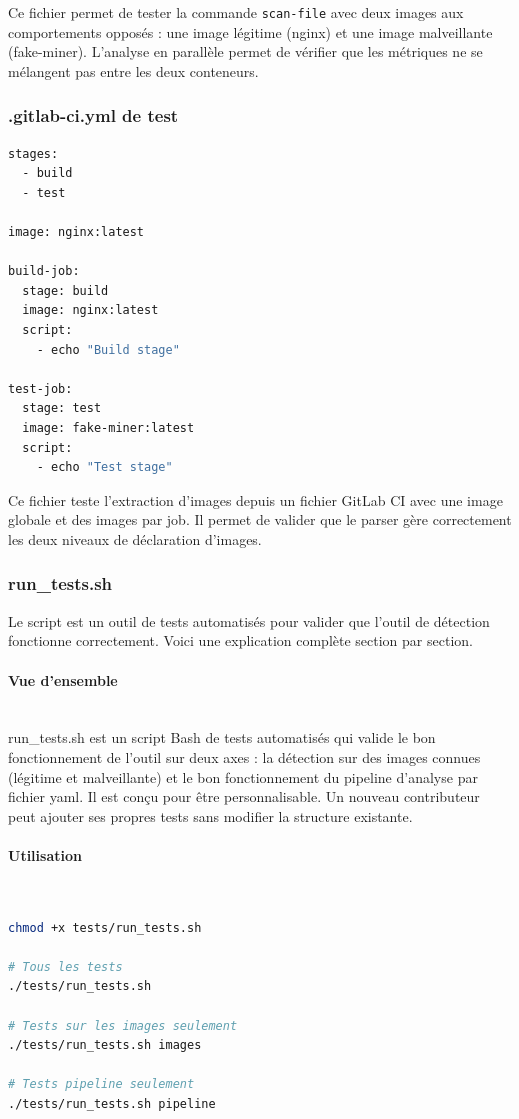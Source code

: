 Ce fichier permet de tester la commande \texttt{scan-file} avec deux images aux comportements opposés : une image légitime (nginx) et une image malveillante (fake-miner). L'analyse en parallèle permet de vérifier que les métriques ne se mélangent pas entre les deux conteneurs.

\subsubsection{.gitlab-ci.yml de test}
\begin{lstlisting}[language=bash, caption=gitlab ci de test]
stages:
  - build
  - test

image: nginx:latest

build-job:
  stage: build
  image: nginx:latest
  script:
    - echo "Build stage"

test-job:
  stage: test
  image: fake-miner:latest
  script:
    - echo "Test stage"
\end{lstlisting}

Ce fichier teste l'extraction d'images depuis un fichier GitLab CI avec une image globale et des images par job. Il permet de valider que le parser gère correctement les deux niveaux de déclaration d'images.

\subsubsection{run\_tests.sh}
Le script est un outil de tests automatisés pour valider que l'outil de détection fonctionne correctement. Voici une explication complète section par section.

\paragraph{Vue d'ensemble} \mbox{} \\
run\_tests.sh est un script Bash de tests automatisés qui valide le bon fonctionnement de l'outil sur deux axes : la détection sur des images connues (légitime et malveillante) et le bon fonctionnement du pipeline d'analyse par fichier yaml. Il est conçu pour être personnalisable. Un nouveau contributeur peut ajouter ses propres tests sans modifier la structure existante.

\paragraph{Utilisation} \mbox{} \\
\begin{lstlisting}[language=bash, caption=Commandes de run\_tests.sh]
chmod +x tests/run_tests.sh

# Tous les tests
./tests/run_tests.sh

# Tests sur les images seulement
./tests/run_tests.sh images

# Tests pipeline seulement
./tests/run_tests.sh pipeline
\end{lstlisting}
